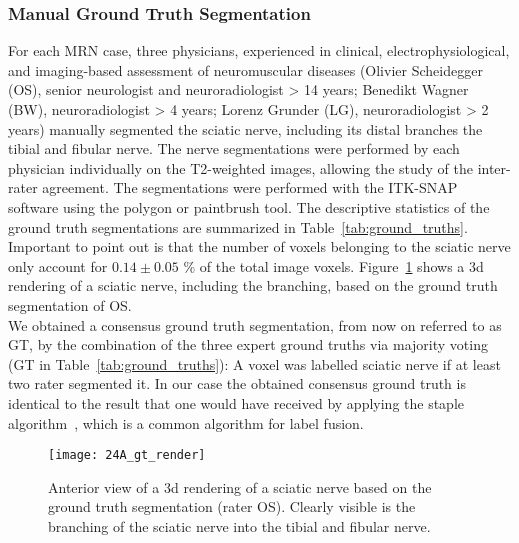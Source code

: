 \subsubsection{Manual Ground Truth Segmentation} \label{dataset_gt}
For each MRN case, three physicians, experienced in clinical, electrophysiological, and imaging-based assessment of neuromuscular diseases (Olivier Scheidegger (OS), senior neurologist and neuroradiologist > 14 years; Benedikt Wagner (BW), neuroradiologist > 4 years; Lorenz Grunder (LG), neuroradiologist > 2 years) manually segmented the sciatic nerve, including its distal branches the tibial and fibular nerve. The nerve segmentations were performed by each physician individually on the T2-weighted images, allowing the study of the inter-rater agreement. The segmentations were performed with the ITK-SNAP~\cite{py06nimg} software using the polygon or paintbrush tool. The descriptive statistics of the ground truth segmentations are summarized in Table~\ref{tab:ground_truths}. Important to point out is that the number of voxels belonging to the sciatic nerve only account for $0.14 \pm 0.05$ \% of the total image voxels. Figure~\ref{fig:gt_render} shows a \gls{3d} rendering of a sciatic nerve, including the branching, based on the ground truth segmentation of OS.\\
We obtained a consensus ground truth segmentation, from now on referred to as GT, by the combination of the three expert ground truths via majority voting (GT in Table~\ref{tab:ground_truths}): A voxel was labelled sciatic nerve if at least two rater segmented it. In our case the obtained consensus ground truth is identical to the result that one would have received by applying the \gls{staple} algorithm~\cite{Warfield2004SimultaneousSTAPLE}, which is a common algorithm for label fusion.\\

\begin{figure}[htbp]
	\texttt{[image: 24A\_gt\_render]}
    \caption[Ground Truth Rendering]{Anterior view of a \gls{3d} rendering of a sciatic nerve based on the ground truth segmentation (rater OS). Clearly visible is the branching of the sciatic nerve into the tibial and fibular nerve.}
    \label{fig:gt_render}
\end{figure}

